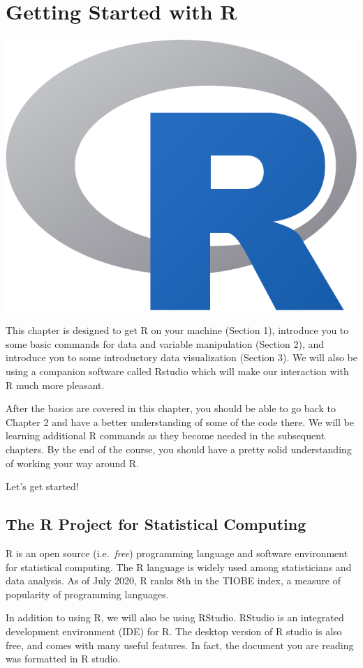 \documentclass[
]{book}
\begin{document}
\hypertarget{R}{%
\chapter{Getting Started with R}\label{R}}

\begin{center}\includegraphics[width=0.4\linewidth]{images/Rlogo} \end{center}

This chapter is designed to get R on your machine (Section 1), introduce you to some basic commands for data and variable manipulation (Section 2), and introduce you to some introductory data visualization (Section 3). We will also be using a companion software called Rstudio which will make our interaction with R much more pleasant.

After the basics are covered in this chapter, you should be able to go back to Chapter 2 and have a better understanding of some of the code there. We will be learning additional R commands as they become needed in the subsequent chapters. By the end of the course, you should have a pretty solid understanding of working your way around R.

Let's get started!

\hypertarget{the-r-project-for-statistical-computing}{%
\section{The R Project for Statistical Computing}\label{the-r-project-for-statistical-computing}}

R is an open source (i.e.~\emph{free}) programming language and software environment for statistical computing. The R language is widely used among statisticians and data analysis. As of July 2020, R ranks 8th in the TIOBE index, a measure of popularity of programming languages.

In addition to using R, we will also be using RStudio. RStudio is an integrated development environment (IDE) for R. The desktop version of R studio is also free, and comes with many useful features. In fact, the document you are reading was formatted in R studio.
\end{document}

